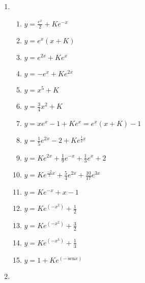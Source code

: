 \documentclass[a4paper]{article}
\providecommand{\sin}{} \renewcommand{\sin}{\hspace{2pt}\mathrm{sen}}
\begin{document}
\begin{enumerate}
\item %

  \begin{enumerate}
  \item $y=\frac{e^x}{2}+ Ke^{-x}$ %
  \item $y=e^x(x+K)$ %
  \item $y=e^{2x} + Ke^x$ %
  \item $y=-e^x+Ke^{2x}$ %
  \item $y=x^5+K$ %
  \item $y=\frac{3}{4}x^2 +K$ %
  \item $y=xe^x -1 +Ke^x = e^x(x+K) -1 $ %
  \item $y=\frac{1}{5}e^{2x} -2 +Ke^{\frac{1}{2}x} $ %
  \item $y=Ke^{2x} + \frac{1}{9}e^{-x} + \frac{1}{3}e^{x} +2$ %
  \item $y= Ke^{\frac{-2}{5}x} + \frac{5}{4}e^{2x} + \frac{10}{17}e^{3x} $ %
  \item $y=K e^{-x} + x -1$ %
  \item $y=Ke^{(-x^2)} + \frac{1}{2} $ %
  \item $y=Ke^{(-x^2)} + \frac{3}{2}$ %
  \item $y=K e^{(-x^3)} + \frac{1}{3} $ %
  \item $y=1+Ke^{(-\sin x)}$ %
  \end{enumerate}

\item %


\end{enumerate}
\end{document}

